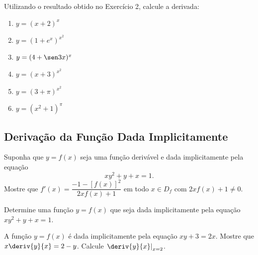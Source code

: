 \begin{exercicio}[3]
Utilizando o resultado obtido no Exercício 2, calcule a derivada:
\begin{enumerate}[label=\alph*)]
    \item $y = (x + 2)^x$
    \item $y = (1 + e^x)^{x^2}$
    \item $y = (4 + \sen 3x)^x$
    \item $y = (x + 3)^{x^2}$
    \item $y = (3 + \pi)^{x^2}$
    \item $y = (x^2 + 1)^\pi$
\end{enumerate}
\end{exercicio}

\clearpage

\subsection{Derivação da Função Dada Implicitamente}

\begin{exercicio}[1]
Suponha que $y = f(x)$ seja uma função derivável e dada implicitamente pela equação
\[
xy^2 + y + x = 1.
\]
Mostre que $f'(x) = \dfrac{-1 - [f(x)]^2}{2xf(x) + 1}$ em todo $x \in D_f$ com $2xf(x) + 1 \neq 0$.
\end{exercicio}

\begin{exercicio}[2]
Determine uma função $y = f(x)$ que seja dada implicitamente pela equação $xy^2 + y + x = 1$.
\end{exercicio}

\begin{exercicio}[3]
A função $y = f(x)$ é dada implicitamente pela equação $xy + 3 = 2x$. Mostre que $x\deriv{y}{x} = 2 - y$. Calcule $\left.\deriv{y}{x}\right|_{x = 2}$.
\end{exercicio}

